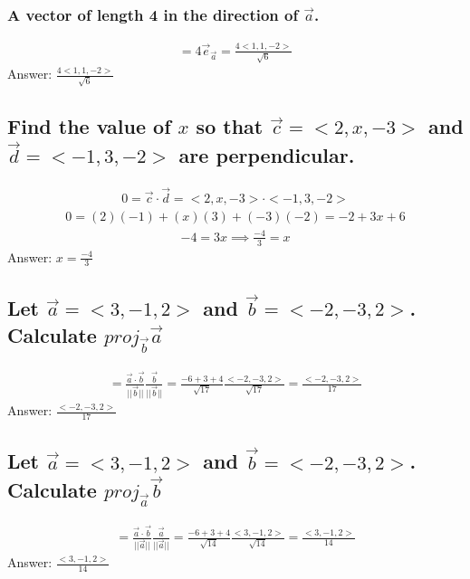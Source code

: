 \documentclass{article}
\begin{document}
\subsubsection{A vector of length 4 in the direction of $\vec{a}$.}
\begin{align*}
	= 4\vec{e}_{\vec{a}} = \frac{4<1, 1, -2>}{\sqrt{6}}
\end{align*}
Answer: $\frac{4<1, 1, -2>}{\sqrt{6}}$

\subsection{Find the value of $x$ so that $\vec{c} = <2, x, -3>$ and $\vec{d} = <-1, 3, -2>$ are perpendicular.}
\begin{align*}
	0 = \vec{c} \cdot \vec{d} = <2, x, -3> \cdot <-1, 3, -2>
\end{align*}
\begin{align*}
	0 = (2)(-1) + (x)(3) + (-3)(-2) = -2 + 3x + 6
\end{align*}
\begin{align*}
	-4 = 3x \implies \frac{-4}{3} = x
\end{align*}
Answer: $x = \frac{-4}{3}$

\subsection{Let $\vec{a} = <3, -1, 2>$ and $\vec{b} = <-2, -3, 2>$. Calculate $proj_{\vec{b}} \vec{a}$}
\begin{align*}
	= \frac{\vec{a} \cdot \vec{b}}{|| \vec{b} ||} \frac{\vec{b}}{|| \vec{b} ||} = \frac{-6 + 3 + 4}{\sqrt{17}} \frac{<-2, -3, 2>}{\sqrt{17}} = \frac{<-2, -3, 2>}{17}
\end{align*}
Answer: $\frac{<-2, -3, 2>}{17}$

\subsection{Let $\vec{a} = <3, -1, 2>$ and $\vec{b} = <-2, -3, 2>$. Calculate $proj_{\vec{a}} \vec{b}$}
\begin{align*}
	= \frac{\vec{a} \cdot \vec{b}}{|| \vec{a} ||} \frac{\vec{a}}{|| \vec{a} ||} = \frac{-6 + 3 + 4}{\sqrt{14}} \frac{<3, -1, 2>}{\sqrt{14}} = \frac{<3, -1, 2>}{14}
\end{align*}
Answer: $\frac{<3, -1, 2>}{14}$
\end{document}
